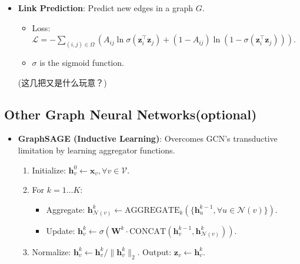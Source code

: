 \documentclass[UTF8]{ctexart}
\begin{document}
\begin{itemize}
\begin{itemize}
\begin{itemize}
        \end{itemize}
        \item \textbf{Link Prediction}: Predict new edges in a graph $G$.
        \begin{itemize}
            \item Loss: $\mathcal{L} = - \sum_{(i,j) \in \Omega} (A_{ij} \ln \sigma(\mathbf{z}_i^\top \mathbf{z}_j) + (1 - A_{ij}) \ln(1 - \sigma(\mathbf{z}_i^\top \mathbf{z}_j)))$.
            \item $\sigma$ is the sigmoid function.
        \end{itemize}
        (这几把又是什么玩意？)
    \end{itemize}

    \subsection{Other Graph Neural Networks(optional)}
    \begin{itemize}
        \item \textbf{GraphSAGE (Inductive Learning)}: Overcomes GCN's transductive limitation by learning aggregator functions.
        \begin{enumerate}
            \item Initialize: $\mathbf{h}_v^0 \leftarrow \mathbf{x}_v, \forall v \in \mathcal{V}$.
            \item For $k=1 \dots K$:
            \begin{itemize}
                \item Aggregate: $\mathbf{h}_{\mathcal{N}(v)}^k \leftarrow \text{AGGREGATE}_k(\{\mathbf{h}_u^{k-1}, \forall u \in \mathcal{N}(v)\})$.
                \item Update: $\mathbf{h}_v^k \leftarrow \sigma \left( \mathbf{W}^k \cdot \text{CONCAT}(\mathbf{h}_v^{k-1}, \mathbf{h}_{\mathcal{N}(v)}^k) \right)$.
            \end{itemize}
            \item Normalize: $\mathbf{h}_v^k \leftarrow \mathbf{h}_v^k / \|\mathbf{h}_v^k\|_2$. Output: $\mathbf{z}_v \leftarrow \mathbf{h}_v^k$.
        \end{enumerate}


\end{itemize}
\end{itemize}
\end{document}
